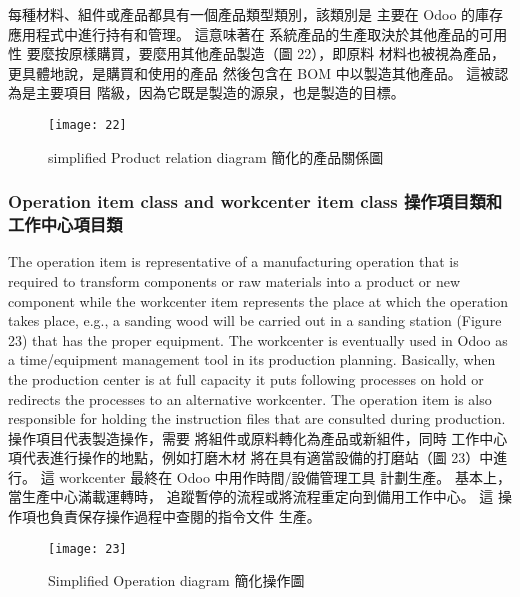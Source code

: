 \fontsize{12}{2.5pt}\sectionef  
{每種材料、組件或產品都具有一個產品類型類別，該類別是
主要在 Odoo 的庫存應用程式中進行持有和管理。 這意味著在
系統產品的生產取決於其他產品的可用性
要麼按原樣購買，要麼用其他產品製造（圖 22），即原料
材料也被視為產品，更具體地說，是購買和使用的產品
然後包含在 BOM 中以製造其他產品。 這被認為是主要項目
階級，因為它既是製造的源泉，也是製造的目標。}\\[15pt]


\begin{figure}[hbt!]
\begin{center}
\texttt{[image: 22]}
\caption{\Large  simplified Product relation diagram  簡化的產品關係圖}\label{fig.22}
\end{center}
\end{figure}


\subsubsection{Operation item class and workcenter item class 操作項目類和工作中心項目類}

\fontsize{12}{2.5pt}\sectionef 
 {The operation item is representative of a manufacturing operation that is required to
transform components or raw materials into a product or new component while the
workcenter item represents the place at which the operation takes place, e.g., a sanding wood
will be carried out in a sanding station (Figure 23) that has the proper equipment. The
workcenter is eventually used in Odoo as a time/equipment management tool in its
production planning. Basically, when the production center is at full capacity it puts
following processes on hold or redirects the processes to an alternative workcenter. The
operation item is also responsible for holding the instruction files that are consulted during
production. }\\[1pt]

\fontsize{12}{2.5pt}\sectionef  
{操作項目代表製造操作，需要
將組件或原料轉化為產品或新組件，同時
工作中心項代表進行操作的地點，例如打磨木材
將在具有適當設備的打磨站（圖 23）中進行。 這
workcenter 最終在 Odoo 中用作時間/設備管理工具
計劃生產。 基本上，當生產中心滿載運轉時，
追蹤暫停的流程或將流程重定向到備用工作中心。 這
操作項也負責保存操作過程中查閱的指令文件
生產。}\\[15pt]

\begin{figure}[hbt!]
\begin{center}
\texttt{[image: 23]}
\caption{\Large Simplified Operation diagram  簡化操作圖}\label{fig.23}
\end{center}
\end{figure}



